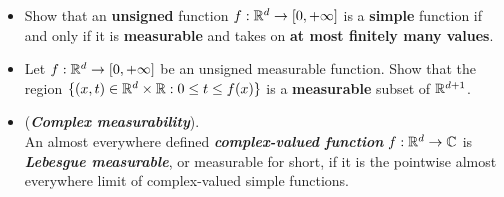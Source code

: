 \documentclass[11pt]{article}
\begin{document}
\begin{itemize}
\begin{proof}
Then for any $\epsilon>0$, there exists $k$, for all $n\ge k$ 
\begin{align*}
\sup_{\mb{x}}\abs{f(\mb{x}) - f_{n}(\mb{x})} 
&\le \frac{1}{2^{n}}<\epsilon. 
\end{align*}
The sequence $\set{f_{n}}$ converges to $f$ uniformly. 

$\Leftarrow$ Given that the unsigned function $f = \lim\limits_{n\rightarrow \infty}f_{n}$ is the uniform limit of bounded simple functions $\set{f_{n}}$, we see that there exist $k\ge 1$, such that for all $n\ge k$, $f_{n}(\mb{x})\ge 0$ for all $\mb{x}$. Then we can find $(i_k, i_{k+1}, \cdots)\subset (k,k+1,\cdots)$ such that  $f_{i_k},f_{i_{k+1}}, \cdots, $ is a monotone increasing sequence of bounded \emph{unsigned} simple function so that $f= \sup_{k}f_{i_k}$. Therefore $f$ is unsigned measureable and $f$ is bounded since $f_{n}$ is bounded for all $n$. \qed
\end{proof}

\item \begin{exercise}
Show that an \textbf{unsigned} function $f: {\mathbb R}^d \rightarrow [0, +\infty]$ is a \textbf{simple} function if and only if it is \textbf{measurable} and takes on \textbf{at most finitely many values}.
\end{exercise}

\item \begin{exercise}
Let $f: {\mathbb R}^d \rightarrow [0, +\infty]$ be an unsigned measurable function. Show that the region $\{(x, t) \in {\mathbb R}^d \times {\mathbb R}: 0 \le t \le f(x)\}$ is a \textbf{measurable} subset of ${\mathbb R}^{d+1}$.
\end{exercise}

\item \begin{definition} (\emph{\textbf{Complex measurability}}).\\
An almost everywhere defined \emph{\textbf{complex-valued function}} $f : {\mathbb R}^d \rightarrow {\mathbb C}$ is \emph{\textbf{Lebesgue measurable}}, or measurable for short, if it is the pointwise almost everywhere limit of complex-valued simple functions.
\end{definition} 
\end{itemize}
\end{document}
